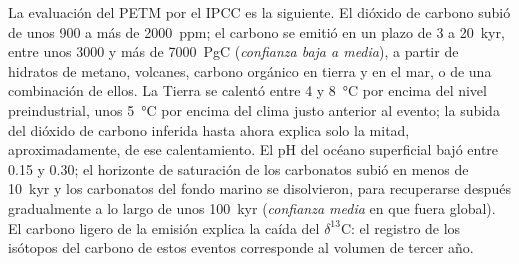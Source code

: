 La evaluación del PETM por el IPCC es la siguiente. El dióxido de carbono subió de unos 900 a más de
\qty{2000}{ppm}; el carbono se emitió en un plazo de 3 a \qty{20}{kyr}, entre unos 3000 y más de
\qty{7000}{PgC} (\emph{confianza baja a media}), a partir de hidratos de metano, volcanes, carbono orgánico
en tierra y en el mar, o de una combinación de ellos. La Tierra se calentó entre 4 y \qty{8}{\celsius} por encima del nivel
preindustrial, unos \qty{5}{\celsius} por encima del clima justo anterior al evento; la subida del dióxido
de carbono inferida hasta ahora explica solo la mitad, aproximadamente, de ese calentamiento. El pH del océano superficial bajó
entre 0.15 y 0.30; el horizonte de saturación de los carbonatos subió en menos de \qty{10}{kyr} y los carbonatos del fondo
marino se disolvieron, para recuperarse después gradualmente a lo largo de unos \qty{100}{kyr} (\emph{confianza media}
en que fuera global). El carbono ligero de la emisión explica la caída del $\delta^{13}$C: el registro de los isótopos
del carbono de estos eventos corresponde al volumen de tercer año.

\begin{omfigure}
\centering
{}
\par{}
\end{omfigure}

